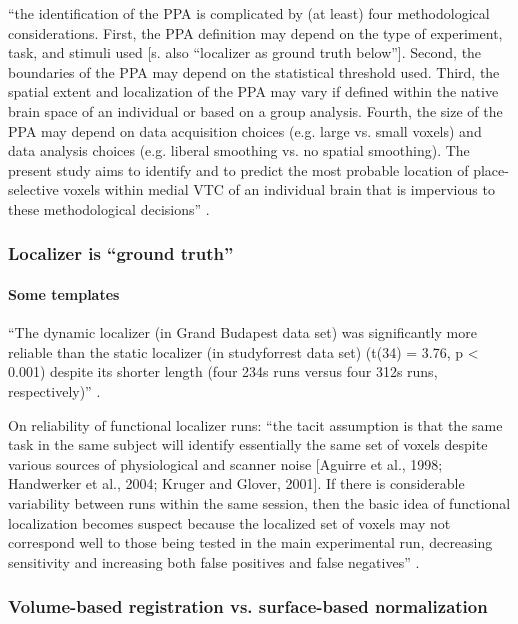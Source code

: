 %
``the identification of the PPA is complicated by (at least) four
methodological considerations.
%
First, the PPA definition may depend on the type of experiment, task, and
stimuli used [s. also ``localizer as ground truth below''].
%
Second, the boundaries of the PPA may depend on the statistical threshold used.
%
Third, the spatial extent and localization of the PPA may vary if defined within
the native brain space of an individual or based on a group analysis.
%
Fourth, the size of the PPA may depend on data acquisition choices (e.g. large
vs. small voxels) and data analysis choices (e.g. liberal smoothing vs. no
spatial smoothing).
%
The present study aims to identify and to predict the most probable location of
place-selective voxels within medial VTC of an individual brain that is
impervious to these methodological decisions'' \citep{weiner2018defining}.


\subsubsection{Localizer is ``ground truth''}



\paragraph{Some templates}
%
``The dynamic localizer (in Grand Budapest data set) was significantly more
reliable than the static localizer (in studyforrest data set) (t(34) = 3.76, p <
0.001) despite its shorter length (four 234s runs versus four 312s runs,
respectively)'' \citep{jiahui2020predicting}.

On reliability of functional localizer runs: ``the tacit assumption is that the
same task in the same subject will identify essentially the same set of voxels
despite various sources of physiological and scanner noise [Aguirre et al.,
1998; Handwerker et al., 2004; Kruger and Glover, 2001]. If there is
considerable variability between runs within the same session, then the basic
idea of functional localization becomes suspect because the localized set of
voxels may not correspond well to those being tested in the main experimental
run, decreasing sensitivity and increasing both false positives and false
negatives'' \citep{duncan2009consistency}.


\subsubsection{Volume-based registration vs. surface-based normalization}

